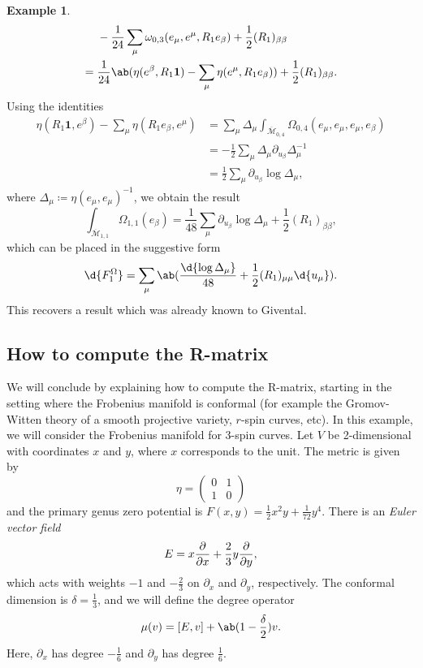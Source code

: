 \documentclass{amsart}
\theoremstyle{definition}
\newtheorem{exm}[thm]{Example}
\theoremstyle{remark}
\theoremstyle{plain}
\theoremstyle{definition}
\theoremstyle{remark}
\newcommand{\Mbar}{\overline{\mathcal{M}}}
\newcommand{\1}{\mathbf{1}}
\newcommand{\2}{\mathbf{2}}
\newcommand{\3}{\mathbf{3}}
\begin{document}
\begin{exm}
\begin{align*}
        &-\frac{1}{24} \sum_{\mu} \omega_{0,3}(e_{\mu}, e^{\mu}, R_1 e_{\beta}) + \frac{1}{2} (R_1)_{\beta\beta} \\
        ={}& \frac{1}{24} \ab(\eta(e^{\beta}, R_1 \1) - \sum_{\mu} \eta(e^{\mu}, R_1 e_{\beta})) + \frac{1}{2} (R_1)_{\beta\beta}.
    \end{align*}
    Using the identities
    \begin{align*}
        \eta(R_1 \1, e^{\beta}) - \sum_{\mu} \eta(R_1 e_{\beta}, e^{\mu}) &= \sum_{\mu} \Delta_{\mu} \int_{\Mbar_{0,4}} \Omega_{0,4}(e_{\mu}, e_{\mu}, e_{\mu}, e_{\beta}) \\
        &= -\frac{1}{2}\sum_{\mu} \Delta_{\mu} \partial_{u_{\beta}} \Delta_{\mu}^{-1} \\
        &= \frac{1}{2} \sum_{\mu} \partial_{u_{\beta}} \log \Delta_{\mu},
    \end{align*}
    where $\Delta_{\mu} \coloneqq \eta(e_{\mu}, e_{\mu})^{-1}$, we obtain the result
    \[ \int_{\Mbar_{1,1}} \Omega_{1,1}(e_{\beta}) = \frac{1}{48} \sum_{\mu} \partial_{u_{\beta}} \log \Delta_{\mu} + \frac{1}{2} (R_1)_{\beta\beta}, \]
    which can be placed in the suggestive form
    \[ \d{F_1^{\Omega}} = \sum_{\mu} \ab( \frac{\d{\log \Delta_{\mu}}}{48} + \frac{1}{2} (R_1)_{\mu\mu} \d{u_{\mu}} ). \]
    This recovers a result which was already known to Givental.
\end{exm}

\subsection{How to compute the R-matrix}%
\label{sub:How to compute the R-matrix}

We will conclude by explaining how to compute the R-matrix, starting in the setting where the Frobenius manifold is conformal (for example the Gromov-Witten theory of a smooth projective variety, \(r\)-spin curves, etc). In this example, we will consider the Frobenius manifold for 3-spin curves. Let \(V\) be 2-dimensional with coordinates \(x\) and \(y\), where \(x\) corresponds to the unit. The metric is given by
\[ \eta = \begin{pmatrix}
    0 & 1 \\
    1 & 0
\end{pmatrix} \]
and the primary genus zero potential is \(F(x,y) = \frac{1}{2} x^2 y + \frac{1}{72} y^4\). There is an \textit{Euler vector field}
\[ E = x \pdv{}{x} + \frac{2}{3} y \pdv{}{y}, \]
which acts with weights \(-1\) and \(-\frac{2}{3}\) on \(\partial_x\) and \(\partial_y\), respectively. The conformal dimension is \(\delta = \frac{1}{3}\), and we will define the degree operator
\[ \mu(v) = [E,v] + \ab(1 - \frac{\delta}{2})v. \]
Here, \(\partial_x\) has degree \(-\frac{1}{6}\) and \(\partial_y\) has degree \(\frac{1}{6}\).
\end{document}
